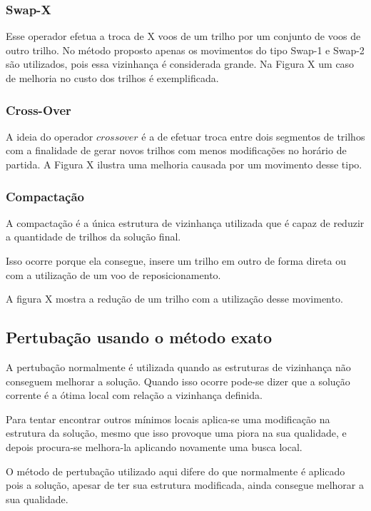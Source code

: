 \subsubsection{Swap-X}

Esse operador efetua a troca de X voos de um trilho por um conjunto de voos de outro trilho. No método proposto apenas os movimentos do tipo Swap-1 e Swap-2 são utilizados, pois essa vizinhança é considerada grande. Na Figura X um caso de melhoria no custo dos trilhos é exemplificada. 
 
 \subsubsection{Cross-Over}
 
 A ideia do operador $crossover$ é a de efetuar troca entre dois segmentos de trilhos com a finalidade de gerar novos trilhos com menos modificações no horário de partida. A Figura X ilustra uma melhoria causada por um movimento desse tipo.
 
 \subsubsection{Compactação}
 
 A compactação é a única estrutura de vizinhança utilizada que é capaz de reduzir a quantidade de trilhos da solução final.
 
 Isso ocorre porque ela consegue, insere um trilho em outro de forma direta ou com a utilização de um voo de reposicionamento.
 
 A figura X mostra a redução de um trilho com a utilização desse movimento.
 
 \subsection{Pertubação usando o método exato}
   
 A pertubação normalmente é utilizada quando as estruturas de vizinhança não conseguem melhorar a solução. Quando isso ocorre pode-se dizer que a solução corrente é a ótima local com relação a vizinhança definida.
 
 Para tentar encontrar outros mínimos locais aplica-se uma modificação na estrutura da solução, mesmo que isso provoque uma piora na sua qualidade, e depois procura-se melhora-la aplicando novamente uma busca local.
 
 O método de pertubação utilizado aqui difere do que normalmente é aplicado pois a solução, apesar de ter sua estrutura modificada, ainda consegue melhorar a sua qualidade.
 
